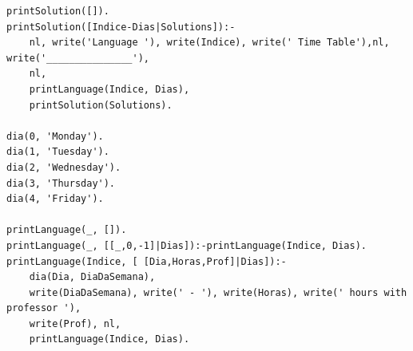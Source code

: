 \documentclass{llncs}
\begin{document}
\begin{verbatim}
printSolution([]).
printSolution([Indice-Dias|Solutions]):-
	nl, write('Language '), write(Indice), write(' Time Table'),nl, write('_______________'),
	nl,
	printLanguage(Indice, Dias),
	printSolution(Solutions).

dia(0, 'Monday').
dia(1, 'Tuesday').
dia(2, 'Wednesday').
dia(3, 'Thursday').
dia(4, 'Friday').

printLanguage(_, []).
printLanguage(_, [[_,0,-1]|Dias]):-printLanguage(Indice, Dias).
printLanguage(Indice, [ [Dia,Horas,Prof]|Dias]):-
	dia(Dia, DiaDaSemana),
	write(DiaDaSemana), write(' - '), write(Horas), write(' hours with professor '), 
	write(Prof), nl,
	printLanguage(Indice, Dias).

\end{verbatim}
\end{document}
